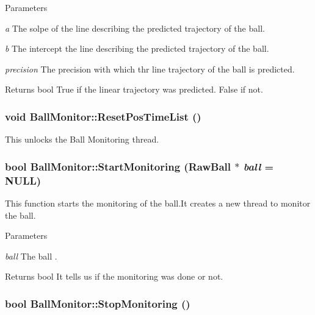 \begin{DoxyParams}{Parameters}
\item[{\em a}]The solpe of the line describing the predicted trajectory of the ball. \item[{\em b}]The intercept the line describing the predicted trajectory of the ball. \item[{\em precision}]The precision with which thr line trajectory of the ball is predicted. \end{DoxyParams}
\begin{DoxyReturn}{Returns}
bool True if the linear trajectory was predicted. False if not. 
\end{DoxyReturn}
\hypertarget{classBallMonitor_a09ed61cf1852d45f03e7aacdebfe0175}{
\subsubsection[{ResetPosTimeList}]{\setlength{\rightskip}{0pt plus 5cm}void BallMonitor::ResetPosTimeList ()}}
\label{classBallMonitor_a09ed61cf1852d45f03e7aacdebfe0175}


This unlocks the Ball Monitoring thread. 

\hypertarget{classBallMonitor_a4d2b3aa764f5d4f4d5f58b7530565f90}{
\subsubsection[{StartMonitoring}]{\setlength{\rightskip}{0pt plus 5cm}bool BallMonitor::StartMonitoring (RawBall $\ast$ {\em ball} = {\ttfamily NULL})}}
\label{classBallMonitor_a4d2b3aa764f5d4f4d5f58b7530565f90}


This function starts the monitoring of the ball.It creates a new thread to monitor the ball. 


\begin{DoxyParams}{Parameters}
\item[{\em ball}]The ball . \end{DoxyParams}
\begin{DoxyReturn}{Returns}
bool It tells us if the monitoring was done or not. 
\end{DoxyReturn}
\hypertarget{classBallMonitor_af71db12abeb1f10f7be58eb7591910a3}{
\subsubsection[{StopMonitoring}]{\setlength{\rightskip}{0pt plus 5cm}bool BallMonitor::StopMonitoring ()}}
\label{classBallMonitor_af71db12abeb1f10f7be58eb7591910a3}


